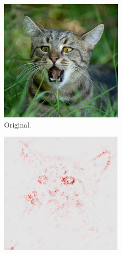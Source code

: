 \begin{figure}[ht]
    \centering
    \begin{subfigure}{0.32\linewidth}
      \includegraphics[width=\linewidth]{figures/cat.JPEG}
      \caption{Original.}
      \label{fig:lrp_cat_orig}
    \end{subfigure}
    \begin{subfigure}{0.32\linewidth}
      \includegraphics[width=\linewidth]{figures/lrp_cat_heatmap.png}

\end{subfigure}
\end{figure}
